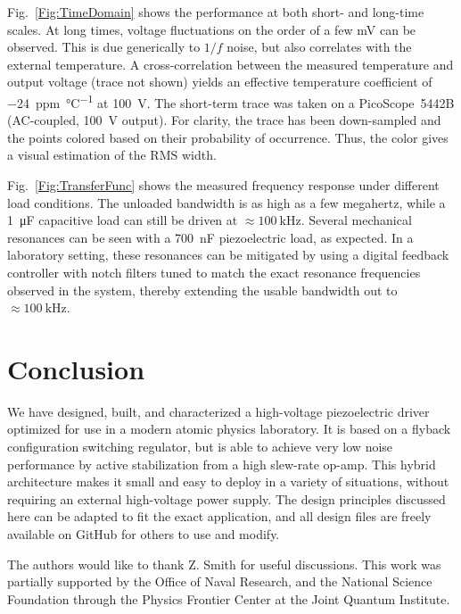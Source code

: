 \documentclass[aip,rsi,reprint]{revtex4-1} %
\begin{document}
Fig.~\ref{Fig:TimeDomain} shows the performance at both short- and long-time scales.
At long times, voltage fluctuations on the order of a few \si{\milli\volt} can be observed.
This is due generically to $1/f$ noise, but also correlates with the external temperature.
A cross-correlation between the measured temperature and output voltage (trace not shown) yields an effective temperature coefficient of \SI[per-mode=symbol]{-24}{ppm\per\celsius} at \SI{100}{\volt}.
The short-term trace was taken on a PicoScope~5442B (AC-coupled, \SI{100}{\volt} output).
For clarity, the trace has been down-sampled and the points colored based on their probability of occurrence.
Thus, the color gives a visual estimation of the RMS width.


Fig.~\ref{Fig:TransferFunc} shows the measured frequency response under different load conditions. The unloaded bandwidth is as high as a few megahertz, while a \SI{1}{\micro\farad} capacitive load can still be driven at $\approx\SI{100}{\kilo\hertz}$. 
Several mechanical resonances can be seen with a \SI{700}{\nano\farad} piezoelectric load, as expected.
In a laboratory setting, these resonances can be mitigated by using a digital feedback controller with notch filters tuned to match the exact resonance frequencies observed in the system\cite{Ryou2016a}, thereby extending the usable bandwidth out to $\approx\SI{100}{\kilo\hertz}$.


\section{Conclusion}
\label{Sec:Conclusion}

We have designed, built, and characterized a high-voltage piezoelectric driver optimized for use in a modern atomic physics laboratory.
It is based on a flyback configuration switching regulator, but is able to achieve very low noise performance by active stabilization from a high slew-rate op-amp.
This hybrid architecture makes it small and easy to deploy in a variety of situations, without requiring an external high-voltage power supply.
The design principles discussed here can be adapted to fit the exact application, and all design files are freely available on GitHub for others to use and modify.

The authors would like to thank Z. Smith for useful discussions.
This work was partially supported by the Office of Naval Research, and the National Science Foundation through the Physics Frontier Center at the Joint Quantum Institute.
 
\end{document}
